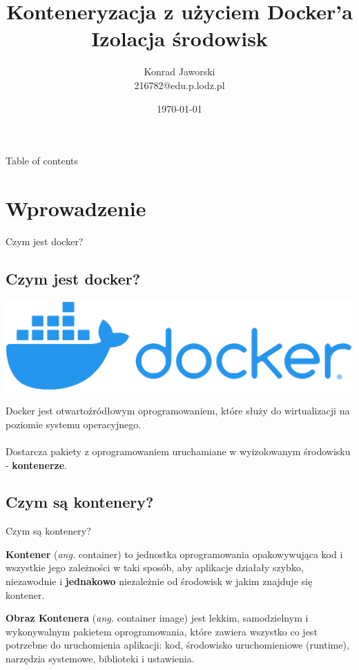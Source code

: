 \documentclass[aspectratio=169]{beamer}
\title{Konteneryzacja z użyciem \textbf{Docker}'a \\Izolacja środowisk}
\date{\today}
\author[Jaworski]{Konrad Jaworski\\216782@edu.p.lodz.pl}
\begin{document}
\begin{frame}
    \titlepage
\end{frame}

\begin{frame}{Table of contents}
    \begin{card}
        \tableofcontents
    \end{card}
\end{frame}

\section{Wprowadzenie}
\begin{frame}{Czym jest docker?}\subsection{Czym jest docker?}

    \centering
    \includegraphics[scale=0.2]{img/logo.png}
    \bigskip

    \begin{card}
        Docker jest otwartoźródłowym oprogramowaniem, które służy do wirtualizacji na poziomie systemu operacyjnego.\\\\
        Dostarcza pakiety z oprogramowaniem uruchamiane w wyizolowanym środowisku - \textbf{kontenerze}.
    \end{card}
\end{frame}




\subsection{Czym są kontenery?}
\begin{frame}{Czym są kontenery?}
    \begin{card}
        \textbf{Kontener} (\textit{ang.} container) to jednostka oprogramowania opakowywująca kod i wszystkie jego zależności w taki sposób, aby aplikacje działały szybko, niezawodnie i \textbf{jednakowo} niezależnie od środowisk w jakim znajduje się kontener.
    \end{card}

    \begin{card}
        \textbf{Obraz Kontenera} (\textit{ang.} container image) jest lekkim, samodzielnym i wykonywalnym pakietem oprogramowania, które zawiera wszystko co jest potrzebne do uruchomienia aplikacji: kod,
        środowisko uruchomieniowe (runtime), narzędzia systemowe, biblioteki i ustawienia.
    \end{card}
\end{frame}
\end{document}
